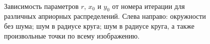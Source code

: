 \begin{figure}[h]
\center
	\\

\caption{Зависимость параметров $r$, $x_0$ и $y_0$ от номера итерации для различных априорных распределений. Слева направо: окружности без шума; шум в радиусе круга; шум в радиусе круга, а также произвольные точки по всему изображению.}
\label{ce:fig4}
\end{figure}

